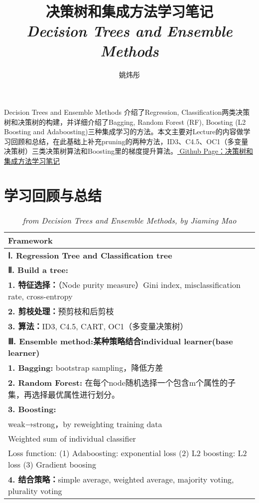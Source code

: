 \documentclass[cn]{elegantpaper}
\title{决策树和集成方法学习笔记\\ \emph{Decision Trees and Ensemble Methods}}
\author{姚炜彤}
\begin{document}
\maketitle

\songti Decision Trees and Ensemble Methods 介绍了Regression, Classification两类决策树和决策树的构建，并详细介绍了Bagging, Random Forest (RF), Boosting (L2 Boosting and Adaboosting)三种集成学习的方法。本文主要对Lecture的内容做学习回顾和总结，在此基础上补充pruning的两种方法，ID3、C4.5、OC1（多变量决策树）三类决策树算法和Boosting里的梯度提升算法。\href{https://ywt26.github.io/blog/2019/05/05/Microeco5}{ Github Page：决策树和集成方法学习笔记}

\section{学习回顾与总结}

    \begin{table}[h]
		\centering
		\begin{tabular}{|l|}
			\hline
			\textbf{Framework}\\
			\hline
			\textbf{Ⅰ. Regression Tree and Classification tree}\\
			\textbf{Ⅱ. Build a tree:}\\
			\quad\textbf{1. 特征选择：}（Node purity measure）Gini index, misclassification rate, cross-entropy\\
            \quad\textbf{2. 剪枝处理：}预剪枝和后剪枝\\
            \quad\textbf{3. 算法：}ID3, C4.5, CART, OC1（多变量决策树）\\
            \textbf{Ⅲ. Ensemble method:某种策略结合individual learner(base learner)}\\
            \quad\textbf{1. Bagging:} bootstrap sampling，降低方差\\
            \quad\textbf{2. Random Forest:} 在每个node随机选择一个包含m个属性的子集，再选择最优属性进行划分。\\
            \quad\textbf{3. Boosting:}\\
            \quad\quad weak→strong，by reweighting training data\\
            \quad\quad Weighted sum of individual classifier\\
            \quad\quad Loss function: (1) Adaboosting: exponential loss\quad
                                      (2) L2 boosting: L2 loss\quad
                                      (3) Gradient boosing\\
            \quad\textbf{4. 结合策略：}simple average, weighted average, majority voting, plurality voting\\
            \hline		
		\end{tabular}
		\caption{ \emph{from Decision Trees and Ensemble Methods, by Jiaming Mao}}
		\label{tab:Margin_settings}
	\end{table}
\end{document}
